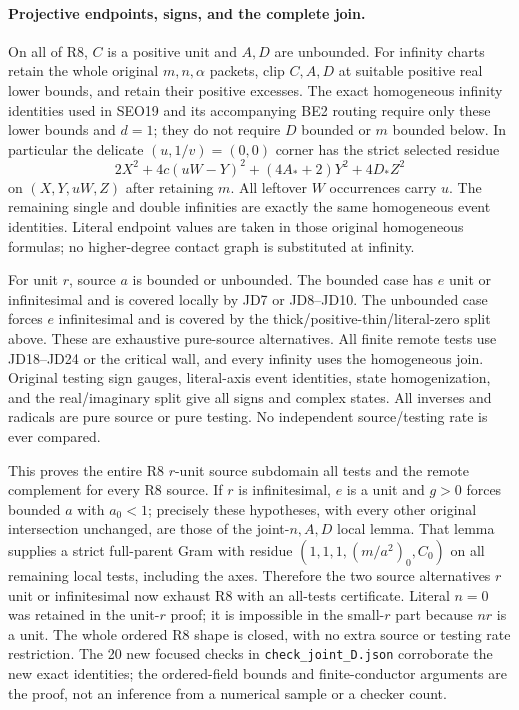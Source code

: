 \paragraph{Projective endpoints, signs, and the complete join.}
On all of R8, $C$ is a positive unit and $A,D$ are unbounded.
For infinity charts retain the whole original $m,n,\alpha$ packets,
clip $C,A,D$ at suitable positive real lower bounds, and retain their
positive excesses.  The exact homogeneous infinity identities used
in SEO19 and its accompanying BE2 routing require only these lower
bounds and $d=1$; they do not require $D$ bounded or $m$ bounded
below.  In particular the delicate $(u,1/v)=(0,0)$ corner has the
strict selected residue
\[
 2X^2+4c(uW-Y)^2+(4A_*+2)Y^2+4D_*Z^2
\]
on $(X,Y,uW,Z)$ after retaining $m$.  All leftover $W$ occurrences
carry $u$.  The remaining single and double infinities are exactly
the same homogeneous event identities.  Literal endpoint values are
taken in those original homogeneous formulas; no higher-degree
contact graph is substituted at infinity.

For unit $r$, source $a$ is bounded or unbounded.  The bounded case
has $e$ unit or infinitesimal and is covered locally by JD7 or
JD8--JD10.  The unbounded case forces $e$ infinitesimal and is
covered by the thick/positive-thin/literal-zero split above.  These
are exhaustive pure-source alternatives.  All finite remote tests
use JD18--JD24 or the critical wall, and every infinity uses the
homogeneous join.  Original testing sign gauges, literal-axis event
identities, state homogenization, and the real/imaginary split give
all signs and complex states.  All inverses and radicals are pure
source or pure testing.  No independent source/testing rate is ever
compared.

This proves the entire R8 $r$-unit source subdomain all tests and
the remote complement for every R8 source.  If $r$ is infinitesimal,
$e$ is a unit and $g>0$ forces bounded $a$ with $a_0<1$; precisely
these hypotheses, with every other original intersection unchanged,
are those of the joint-$n,A,D$ local lemma.  That lemma supplies a
strict full-parent Gram with residue $(1,1,1,(m/a^2)_0,C_0)$ on
all remaining local tests, including the axes.  Therefore the two
source alternatives $r$ unit or infinitesimal now exhaust R8 with
an all-tests certificate.  Literal $n=0$ was retained in the unit-$r$
proof; it is impossible in the small-$r$ part because $nr$ is a unit.
The whole ordered R8 shape is closed, with no extra source or testing
rate restriction.  The 20 new focused checks in \texttt{check\_joint\_D.json}
corroborate the new exact identities; the ordered-field bounds and
finite-conductor arguments are the proof, not an inference from a
numerical sample or a checker count.
